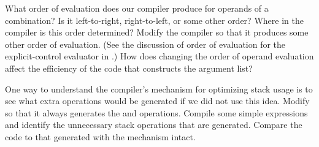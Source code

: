 \begin{exercise}
	\label{Exercise 5.36}
	What order of evaluation does our compiler produce for operands of a combination?
	Is it left-to-right, right-to-left, or some other order?
	Where in the compiler is this order determined?
	Modify the compiler so that it produces some other order of evaluation.
	(See the discussion of order of evaluation for the explicit-control evaluator in .)
	How does changing the order of operand evaluation affect the efficiency of the code that constructs the argument list?
\end{exercise}



\begin{exercise}
	\label{Exercise 5.37}
	One way to understand the compiler’s  mechanism for optimizing stack usage is to see what extra operations would be generated if we did not use this idea.
	Modify  so that it always generates the  and  operations.
	Compile some simple expressions and identify the unnecessary stack operations that are generated.
	Compare the code to that generated with the  mechanism intact.
\end{exercise}



